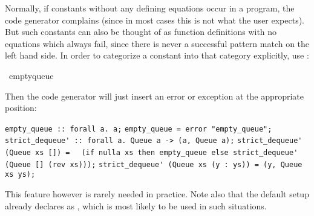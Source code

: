\begin{isabellebody}
\begin{isamarkuptext}
  Normally, if constants without any defining equations occur in
  a program, the code generator complains (since in most cases
  this is not what the user expects).  But such constants can also
  be thought of as function definitions with no equations which
  always fail, since there is never a successful pattern match
  on the left hand side.  In order to categorize a constant into
  that category explicitly, use \hyperlink{command.code-abort}{\mbox{}}:%
\end{isamarkuptext}%
\isamarkuptrue%
%
\isadelimquote
%
\endisadelimquote
%
\isatagquote
{}\isamarkupfalse%
\ empty{\isacharunderscore}queue%
\endisatagquote
{\isafoldquote}%
%
\isadelimquote
%
\endisadelimquote
%
\begin{isamarkuptext}%
\noindent Then the code generator will just insert an error or
  exception at the appropriate position:%
\end{isamarkuptext}%
\isamarkuptrue%
%
\isadelimquote
%
\endisadelimquote
%
\isatagquote
%
\begin{isamarkuptext}%
\isaverbatim%
\noindent%
\verb|empty_queue :: forall a. a;|\newline%
\verb|empty_queue = error "empty_queue";|\newline%
\newline%
\verb|strict_dequeue' :: forall a. Queue a -> (a, Queue a);|\newline%
\verb|strict_dequeue' (Queue xs []) =|\newline%
\verb|  (if nulla xs then empty_queue else strict_dequeue' (Queue [] (rev xs)));|\newline%
\verb|strict_dequeue' (Queue xs (y : ys)) = (y, Queue xs ys);|%
\end{isamarkuptext}%
\isamarkuptrue%
%
\endisatagquote
{\isafoldquote}%
%
\isadelimquote
%
\endisadelimquote
%
\begin{isamarkuptext}%
\noindent This feature however is rarely needed in practice.
  Note also that the  default setup already declares
   as \hyperlink{command.code-abort}{\mbox{}}, which is most
  likely to be used in such situations.%
\end{isamarkuptext}%
\isamarkuptrue%
%
\isadelimtheory
%
\endisadelimtheory
%
\isatagtheory
{}\isamarkupfalse%
%
\endisatagtheory
{\isafoldtheory}%
%
\isadelimtheory
%
\endisadelimtheory
\isanewline
\ \end{isabellebody}%
